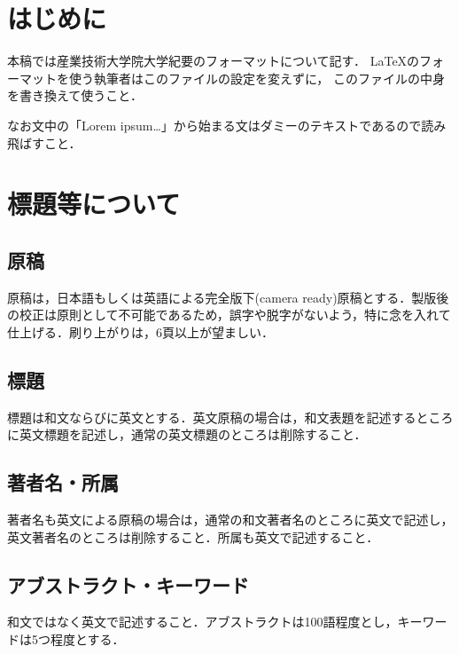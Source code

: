 
\pagestyle{empty}
\maketitle

\begin{multicols}{2}
\section{はじめに}
本稿では産業技術大学院大学紀要のフォーマットについて記す．
\LaTeX のフォーマットを使う執筆者はこのファイルの設定を変えずに，
このファイルの中身を書き換えて使うこと．

なお文中の「Lorem ipsum\ldots」から始まる文はダミーのテキストであるので読み飛ばすこと．

\section{標題等について}
\subsection{原稿}
原稿は，日本語もしくは英語による完全版下(camera ready)原稿とする．製版後の校正は原則として不可能であるため，誤字や脱字がないよう，特に念を入れて仕上げる．刷り上がりは，6頁以上が望ましい．

\subsection{標題}
標題は和文ならびに英文とする．英文原稿の場合は，和文表題を記述するところに英文標題を記述し，通常の英文標題のところは削除すること．

\subsection{著者名・所属}
著者名も英文による原稿の場合は，通常の和文著者名のところに英文で記述し，英文著者名のところは削除すること．所属も英文で記述すること．

\subsection{アブストラクト・キーワード}
和文ではなく英文で記述すること．アブストラクトは100語程度とし，キーワードは5つ程度とする．


\end{multicols}

